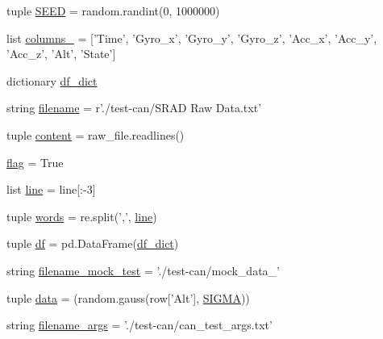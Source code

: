 \begin{DoxyCompactItemize}
\item 
tuple \hyperlink{namespacegenerate__test__file_a73a2892e699ae640f1fd7262c74fa733}{S\-E\-E\-D} = random.\-randint(0, 1000000)
\item 
list \hyperlink{namespacegenerate__test__file_a5c7135c9c0c283f7b8f63639d0097702}{columns\-\_\-} = \mbox{[}'Time', 'Gyro\-\_\-x', 'Gyro\-\_\-y', 'Gyro\-\_\-z', 'Acc\-\_\-x', 'Acc\-\_\-y', 'Acc\-\_\-z', 'Alt', 'State'\mbox{]}
\item 
dictionary \hyperlink{namespacegenerate__test__file_a901a3dccd6aeba8324f62b08a13f7b90}{df\-\_\-dict}
\item 
string \hyperlink{namespacegenerate__test__file_af97ace4c580ad8a8a1468e21ae2d2b0a}{filename} = r'./test-\/can/S\-R\-A\-D Raw Data.\-txt'
\item 
tuple \hyperlink{namespacegenerate__test__file_a524c28ccabc9eaefc102531d413e46c3}{content} = raw\-\_\-file.\-readlines()
\item 
\hyperlink{namespacegenerate__test__file_ab1543fba4ccafa097bd330adcc0c26ce}{flag} = True
\item 
list \hyperlink{namespacegenerate__test__file_ade66fab6904c7b63ae363d004a9dd251}{line} = line\mbox{[}\-:-\/3\mbox{]}
\item 
tuple \hyperlink{namespacegenerate__test__file_a2611e255147f82c1cfe8ab05918ae38b}{words} = re.\-split(',', \hyperlink{namespacegenerate__test__file_ade66fab6904c7b63ae363d004a9dd251}{line})
\item 
tuple \hyperlink{namespacegenerate__test__file_ad42c259673c60b9a04a9473cd53341e2}{df} = pd.\-Data\-Frame(\hyperlink{namespacegenerate__test__file_a901a3dccd6aeba8324f62b08a13f7b90}{df\-\_\-dict})
\item 
string \hyperlink{namespacegenerate__test__file_a93a79e69087952ef413ac002eb1391e4}{filename\-\_\-mock\-\_\-test} = './test-\/can/mock\-\_\-data\-\_\-'
\item 
tuple \hyperlink{namespacegenerate__test__file_aa8c6ec31362d28e7d223946dd31a6f19}{data} = (random.\-gauss(row\mbox{[}'Alt'\mbox{]}, \hyperlink{namespacegenerate__test__file_a34a98faa00c665c3cc688ef6d170b3c0}{S\-I\-G\-M\-A}))
\item 
string \hyperlink{namespacegenerate__test__file_a743ab44655d3357940e12b19cffa1e59}{filename\-\_\-args} = './test-\/can/can\-\_\-test\-\_\-args.\-txt'
\end{DoxyCompactItemize}


